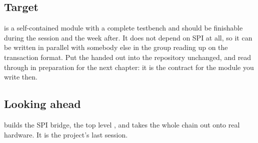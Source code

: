 \subsection*{Target}
 is a self-contained module with a complete testbench and should be finishable
during the session and the week after. It does not depend on SPI at all, so it can be written in
parallel with somebody else in the group reading up on the transaction format. Put the
 handed out into the repository unchanged, and read through
 in preparation for the next chapter: it is the contract for the module
you write then.

\subsection*{Looking ahead}
 builds the SPI bridge, the top level , and takes the whole chain
out onto real hardware. It is the project's last session.
